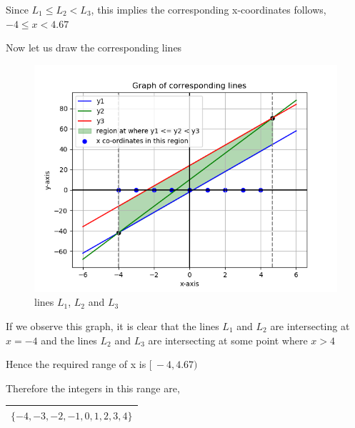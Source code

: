 \documentclass[16pt, a4paper, two column]{article}
\begin{document}
Since $L_1 \leq L_2 < L_3$, this implies the corresponding x-coordinates follows, $-4 \leq x < 4.67$ \newline

\noindent Now let us draw the corresponding lines

\begin{figure}[h]
    \includegraphics[width = \columnwidth]{Figure_1}
    \caption{lines $L_1$, $L_2$ and $L_3$}
    \label{fig:mesh1}
\end{figure}


\noindent If we observe this graph, it is clear that the lines $L_1$ and $L_2$ are intersecting at $x = -4$ and the lines $L_2$ and $L_3$ are intersecting at some point where $x>4$ \newline

Hence the required range of x is $[\ -4, 4.67)\ $\newline


\noindent Therefore the integers in this range are,

\begin{center}
\begin{tabular}{|c|}
\hline
\textbf{$ \{ -4, -3, -2, -1, 0, 1, 2, 3, 4\}$} \\
\hline
\end{tabular}
\end{center}
\end{document}
